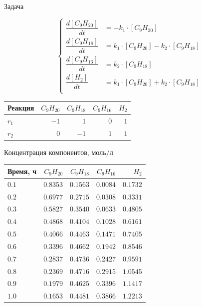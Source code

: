 \documentclass[aspectratio=169, mathserif]{beamer}%
\begin{document}
\begin{frame}[fragile, label=c]{Задача}
\scriptsize
\begin{minipage}{.3\textwidth}
$$
\left\{
\begin{aligned}
\dfrac{d\left[C_9H_{20}\right]}{dt} &= -k_1 \cdot \left[C_9H_{20}\right] \\
\dfrac{d\left[C_9H_{18}\right]}{dt} &= k_1 \cdot \left[C_9H_{20}\right] - k_2 \cdot \left[C_9H_{18}\right] \\
\dfrac{d\left[C_9H_{16}\right]}{dt} &= k_2 \cdot \left[C_9H_{18}\right] \\
\dfrac{d\left[H_2\right]}{dt} &= k_1 \cdot \left[C_9H_{20}\right] + k_2 \cdot \left[C_9H_{18}\right] \\
\end{aligned}
\right.
$$
\vfill
\begin{table}[h!]
\begin{tabular}{|l|r|r|r|r|}
\hline
Реакция & $C_9H_{20}$ & $C_9H_{18}$ & $C_9H_{16}$ & $H_2$ \\
\hline
$r_1$ & $-1$ & $1$ & $0$ & $1$ \\
\hline
$r_2$ & $0$ & $-1$ & $1$ & $1$ \\
\hline
\end{tabular}
\end{table}
\vfill
\end{minipage}
\hspace{.19\textwidth}
\begin{minipage}{.5\textwidth}
\centering
Концентрация компонентов, $\mathrm{моль / л}$
\begin{table}[h!]
\begin{tabular}{|l|r|r|r|r|}
\hline
Время, ч & $C_9H_{20}$ & $C_9H_{18}$ & $C_9H_{16}$ & $H_2$ \\
\hline
$0.1$ & $0.8353$ & $0.1563$ & $0.0084$ & $0.1732$ \\
\hline
$0.2$ & $0.6977$ & $0.2715$ & $0.0308$ & $0.3331$ \\
\hline
$0.3$ & $0.5827$ & $0.3540$ & $0.0633$ & $0.4805$ \\
\hline
$0.4$ & $0.4868$ & $0.4104$ & $0.1028$ & $0.6161$ \\
\hline
$0.5$ & $0.4066$ & $0.4463$ & $0.1471$ & $0.7405$ \\
\hline
$0.6$ & $0.3396$ & $0.4662$ & $0.1942$ & $0.8546$ \\
\hline
$0.7$ & $0.2837$ & $0.4736$ & $0.2427$ & $0.9591$ \\
\hline
$0.8$ & $0.2369$ & $0.4716$ & $0.2915$ & $1.0545$ \\
\hline
$0.9$ & $0.1979$ & $0.4625$ & $0.3396$ & $1.1417$ \\
\hline
$1.0$ & $0.1653$ & $0.4481$ & $0.3866$ & $1.2213$ \\
\hline
\end{tabular}
\end{table}
\end{minipage}
\vfill
\end{frame}
\end{document}
